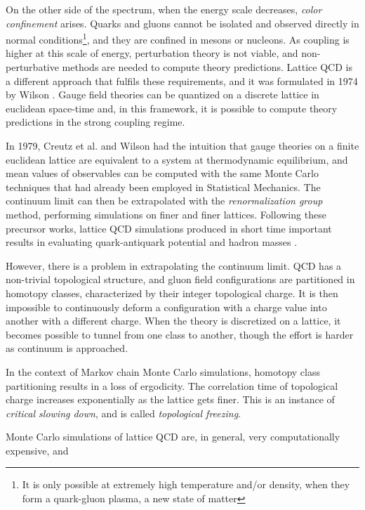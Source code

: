 On the other side of the spectrum, when the energy scale decreases, \emph{color confinement} arises.
Quarks and gluons cannot be isolated and observed directly in normal conditions\footnote{It is only possible at extremely high temperature and/or density, when they form a quark-gluon plasma, a new state of matter},
and they are confined in mesons or nucleons.
As coupling is higher at this scale of energy, perturbation theory is not viable, and non-perturbative methods are needed to compute theory predictions.
Lattice QCD is a different approach that fulfils these requirements, and it was formulated in 1974 by Wilson \cite{wilson:1974}.
Gauge field theories can be quantized on a discrete lattice in euclidean space-time and,
in this framework, it is possible to compute theory predictions in the strong coupling regime.

In 1979, Creutz et al. \cite{creutz:1979} and Wilson \cite{wilson:1979}
had the intuition that gauge theories on a finite euclidean lattice are equivalent to a system at thermodynamic equilibrium,
and mean values of observables can be computed with the same Monte Carlo techniques that had already been employed in Statistical Mechanics.
The continuum limit can then be extrapolated with the \emph{renormalization group} method, performing simulations on finer and finer lattices.
Following these precursor works, lattice QCD simulations produced in short time important results in evaluating quark-antiquark potential and hadron masses
\cite{creutz:1980, weingarten:1981, hamber-parisi:1981}.

However, there is a problem in extrapolating the continuum limit.
QCD has a non-trivial topological structure, and gluon field configurations are partitioned in homotopy classes, characterized by their integer topological charge.
It is then impossible to continuously deform a configuration with a charge value into another with a different charge.
When the theory is discretized on a lattice, it becomes possible to tunnel from one class to another,
though the effort is harder as continuum is approached.

In the context of Markov chain Monte Carlo simulations, homotopy class partitioning results in a loss of ergodicity.
The correlation time of topological charge increases exponentially as the lattice gets finer.
This is an instance of \emph{critical slowing down}, and is called \emph{topological freezing}.






Monte Carlo simulations of lattice QCD are, in general, very computationally expensive,
and 















\endgroup

\vfill
